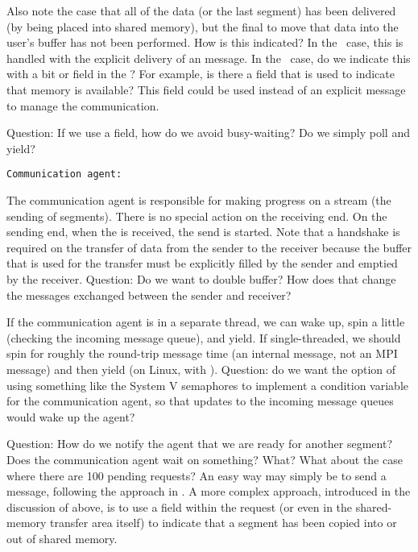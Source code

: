 \begin{mmadi}
\begin{shmem}
Also note the case that all of the data (or the last segment) has been
delivered (by being placed 
into shared memory), but the final  to move that data
into the user's buffer has not been performed.  How is this indicated?  In the
\tcpname\ case, this is handled with the explicit delivery of an
 message.  In the \shmemname\ case, do we indicate
this with a bit or field in the ?  For example, is
there a  field that is used to indicate
that memory is available?  This field could be used instead of an explicit
message to manage the communication.  

Question: If we use a  field, how do we avoid
busy-waiting?  Do we simply poll and yield?

\texttt{Communication agent:}

The communication agent is responsible for making progress on a stream (the
sending of segments).  There is no special action on the receiving end.  On
the sending end, when the  is received, the
send is started.  Note that a handshake is required on the transfer of data
from the sender to the receiver because the buffer that is used for the
transfer must be explicitly filled by the sender and emptied by the receiver.
Question: Do we want to double buffer?  How does that change the messages
exchanged between the sender and receiver?

If the communication agent is in a separate thread, we can wake up, spin a
little (checking the incoming message queue), and yield.  If single-threaded,
we should spin for roughly the round-trip message time (an internal message,
not an MPI message) and then yield (on Linux, with ).
Question: do we want the option of using something like the System V
semaphores to implement a condition variable for the communication agent, so
that updates to the incoming message queues would wake up the agent?

Question: How do we notify the agent that we are ready for another segment?
Does the communication agent wait on something?  What?  What about the case
where there are 100 pending requests?
An easy way may simply be to send a message, following the approach in
\tcpname.  A more complex approach, introduced in the discussion of
 above, is to use a field within the request (or even in the
shared-memory transfer area itself) to indicate that a segment has been copied
into or out of shared memory.  


\end{shmem}
\end{mmadi}
